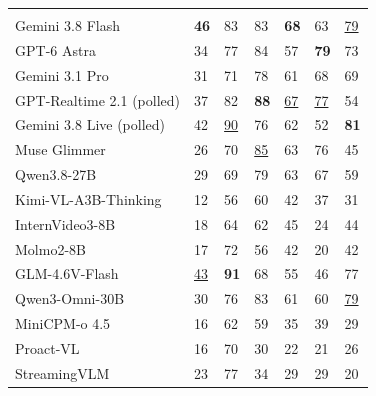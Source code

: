 \begingroup
\setlength{\tabcolsep}{0pt}
\renewcommand{\arraystretch}{1.02}
\fontsize{8.6}{10.7}\selectfont
\begin{tabular}{@{}L{.28\linewidth}K{ivgscreen}{.10\linewidth}K{ivgquality}{.124\linewidth}K{ivgquality}{.124\linewidth}K{ivgquality}{.124\linewidth}K{ivgquality}{.124\linewidth}K{ivgquality}{.124\linewidth}@{}}
\toprule
{} &  &  &  &  &  & \\
Gemini 3.8 Flash & \textbf{46} & 83 & 83 & \textbf{68} & 63 & \underline{79}\\
GPT-6 Astra & 34 & 77 & 84 & 57 & \textbf{79} & 73\\
Gemini 3.1 Pro & 31 & 71 & 78 & 61 & 68 & 69\\
GPT-Realtime 2.1 (polled) & 37 & 82 & \textbf{88} & \underline{67} & \underline{77} & 54\\
Gemini 3.8 Live (polled) & 42 & \underline{90} & 76 & 62 & 52 & \textbf{81}\\
Muse Glimmer & 26 & 70 & \underline{85} & 63 & 76 & 45\\
Qwen3.8-27B & 29 & 69 & 79 & 63 & 67 & 59\\
Kimi-VL-A3B-Thinking & 12 & 56 & 60 & 42 & 37 & 31\\
InternVideo3-8B & 18 & 64 & 62 & 45 & 24 & 44\\
Molmo2-8B & 17 & 72 & 56 & 42 & 20 & 42\\
GLM-4.6V-Flash & \underline{43} & \textbf{91} & 68 & 55 & 46 & 77\\
Qwen3-Omni-30B & 30 & 76 & 83 & 61 & 60 & \underline{79}\\
MiniCPM-o 4.5 & 16 & 62 & 59 & 35 & 39 & 29\\
Proact-VL & 16 & 70 & 30 & 22 & 21 & 26\\
StreamingVLM & 23 & 77 & 34 & 29 & 29 & 20\\
\bottomrule
\end{tabular}\par
\endgroup
{}
